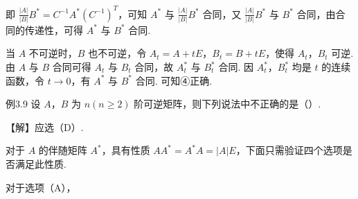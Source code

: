 即 $\frac{|A|}{|B|}B^*=C^{-1}A^*(C^{-1})^{T}$，可知 $A^*$ 与 $\frac{|A|}{|B|}B^*$ 合同，又 $\frac{|A|}{|B|}B^*$ 与 $B^*$ 合同，由合同的传递性，可得 $A^*$ 与 $B^*$ 合同.

当 $A$ 不可逆时，$B$ 也不可逆，令 $A_t=A+tE$，$B_t=B+tE$，使得 $A_t$，$B_t$ 可逆. 由 $A$ 与 $B$ 合同可得 $A_t$ 与 $B_t$ 合同，故 $A_t^*$ 与 $B_t^*$ 合同. 因 $A_t^*$，$B_t^*$ 均是 $t$ 的连续函数，令 $t\to0$，有 $A^*$ 与 $B^*$ 合同. 可知④正确.

\begin{fcard}{例3.9}
设 $A$，$B$ 为 $n(n\ge2)$ 阶可逆矩阵，则下列说法中不正确的是（\quad）.

\end{fcard}

【解】应选（D）.

对于 $A$ 的伴随矩阵 $A^*$，具有性质 $AA^*=A^*A=|A|E$，下面只需验证四个选项是否满足此性质.

对于选项（A），

